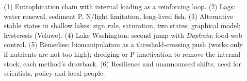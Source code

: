 \begin{longans}
(1) Eutrophication chain with internal loading as a reinforcing loop. (2) Lags: water renewal, sediment P, N/light
limitation, long-lived fish. (3) Alternative stable states in shallow lakes: sign rule, saturation, two states;
graphical model; hysteresis (Veluwe). (4) Lake Washington: second jump with \emph{Daphnia}; food-web control.
(5) Remedies: biomanipulation as a threshold-crossing push (works only if nutrients are not too high); dredging or
P inactivation to remove the internal stock; each method's drawback. (6) Resilience and unannounced shifts; need for
scientists, policy and local people.
\end{longans}
